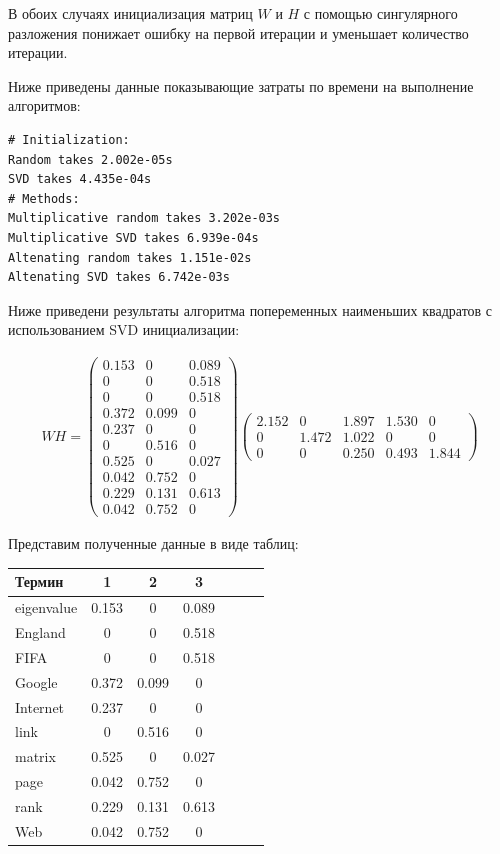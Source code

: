 \documentclass[14pt]{extarticle}
\makeatletter
\newcommand{\verbatimfont}[1]{\renewcommand{\verbatim@font}{\ttfamily#1}}
\makeatother
\begin{document}
В обоих случаях инициализация матриц $W$ и $H$ с помощью сингулярного разложения понижает ошибку на первой итерации и уменьшает количество итерации.


\newpage


Ниже приведены данные показывающие затраты по времени на выполнение алгоритмов:

\verbatimfont{\small}
\begin{verbatim}
# Initialization:
Random takes 2.002e-05s
SVD takes 4.435e-04s
# Methods:
Multiplicative random takes 3.202e-03s
Multiplicative SVD takes 6.939e-04s
Altenating random takes 1.151e-02s
Altenating SVD takes 6.742e-03s
\end{verbatim}

Ниже приведени результаты алгоритма попеременных наименьших квадратов с использованием SVD инициализации:

\begin{align*}
W H = 
\begin{pmatrix}
     0.153  &   0  &   0.089 \\
     0  &   0  &   0.518 \\
     0  &   0  &   0.518 \\ 
     0.372  &   0.099  &   0 \\
     0.237  &   0  &   0 \\
     0  &   0.516  &   0 \\ 
     0.525  &  	0  &   0.027 \\
     0.042  &   0.752  &   0 \\
     0.229  &   0.131  &   0.613 \\
     0.042  &   0.752  &   0
\end{pmatrix}
\begin{pmatrix}
     2.152  &   0  &   1.897  &   1.530  &  0 \\
     0  &   1.472  &   1.022  &   0  &   0 \\
     0  &   0  &   0.250  &   0.493  &   1.844
\end{pmatrix}
\end{align*}

 Представим полученные данные в виде таблиц:

\begin{center}
 \begin{tabular}{ l | c c c c c c } 
 Термин      & 1 & 2 & 3 \\
 \hline
 eigenvalue  & 0.153  &   0  &   0.089 \\
 England     & 0  &   0  &   0.518 \\
 FIFA        & 0  &   0  &   0.518 \\ 
 Google      & 0.372  &   0.099  &   0 \\
 Internet    & 0.237  &   0  &   0 \\
 link        & 0  &   0.516  &   0 \\ 
 matrix      & 0.525  &  	0  &   0.027 \\
 page        & 0.042  &   0.752  &   0 \\
 rank        & 0.229  &   0.131  &   0.613 \\
 Web         & 0.042  &   0.752  &   0
\end{tabular}
\end{center}
\end{document}

